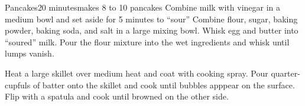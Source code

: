 \begin{recipe}{Pancakes}{20 minutes}{makes 8 to 10 pancakes}
  Combine milk with vinegar in a medium bowl and set aside for 5 minutes to ``sour''
  Combine flour, sugar, baking powder, baking soda, and salt in a large mixing bowl. 
  Whisk egg and butter into ``soured'' milk. Pour the flour mixture into the wet ingredients and whisk until lumps vanish.

  Heat a large skillet over medium heat and coat with cooking spray. Pour quarter-cupfuls of batter onto the skillet and cook until bubbles apppear on the surface. Flip with a spatula and cook until browned on the other side.
\end{recipe}

